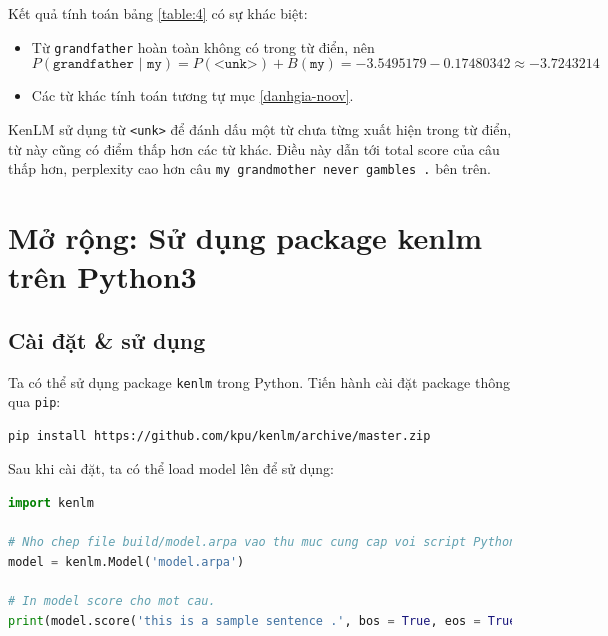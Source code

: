 \documentclass[12pt]{article}
\begin{document}
\noindent Kết quả tính toán bảng \ref{table:4} có sự khác biệt:
\begin{itemize}
\item Từ \texttt{grandfather} hoàn toàn không có trong từ điển, nên 
$$
P(\texttt{grandfather | my}) = P(\texttt{<unk>}) + B(\texttt{my}) = -3.5495179 - 0.17480342 \approx -3.7243214
$$
\item Các từ khác tính toán tương tự mục \ref{danhgia-noov}.
\end{itemize}
KenLM sử dụng từ \texttt{<unk>} để đánh dấu một từ chưa từng xuất hiện trong từ điển, từ này cũng có điểm thấp hơn các từ khác. Điều này dẫn tới total score của câu thấp hơn, perplexity cao hơn câu \texttt{my grandmother never gambles .} bên trên.

\section{Mở rộng: Sử dụng package kenlm trên Python3}\label{python-kenlm}
\subsection{Cài đặt \& sử dụng}
Ta có thể sử dụng package \texttt{kenlm} trong Python. Tiến hành cài đặt package thông qua \texttt{pip}:
\begin{lstlisting}[language=sh]
pip install https://github.com/kpu/kenlm/archive/master.zip
\end{lstlisting}
Sau khi cài đặt, ta có thể load model lên để sử dụng:
\begin{lstlisting}[language=python]
import kenlm

# Nho chep file build/model.arpa vao thu muc cung cap voi script Python!
model = kenlm.Model('model.arpa')

# In model score cho mot cau.
print(model.score('this is a sample sentence .', bos = True, eos = True))
\end{lstlisting}
\end{document}
